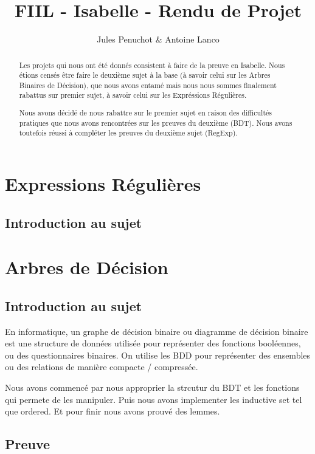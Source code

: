 \documentclass{article}
\title{FIIL - Isabelle - Rendu de Projet}
\author{Jules Penuchot \& Antoine Lanco}
\begin{document}
\maketitle

\begin{abstract}

Les projets qui nous ont été donnés consistent à faire de la preuve en Isabelle. Nous étions censés être faire le deuxième sujet à la base (à savoir celui sur les Arbres Binaires de Décision), que nous avons entamé mais nous nous sommes finalement rabattus sur premier sujet, à savoir celui sur les Expréssions Régulières.

Nous avons décidé de nous rabattre sur le premier sujet en raison des difficultés pratiques que nous avons rencontrées sur les preuves du deuxième (BDT). Nous avons toutefois réussi à compléter les preuves du deuxième sujet (RegExp).

\end{abstract}

\section{Expressions Régulières}

\subsection{Introduction au sujet}



\section{Arbres de Décision}

\subsection{Introduction au sujet}

En informatique, un graphe de décision binaire ou diagramme de décision binaire
est une structure de données utilisée pour représenter des fonctions booléennes,
ou des questionnaires binaires. On utilise les BDD pour représenter des
ensembles ou des relations de manière compacte / compressée.

Nous avons commencé par nous approprier la strcutur du BDT et les fonctions qui permete de les manipuler. Puis nous avons implementer les inductive set tel que
ordered. Et pour finir nous avons prouvé des lemmes.

\subsection{Preuve}
\end{document}

